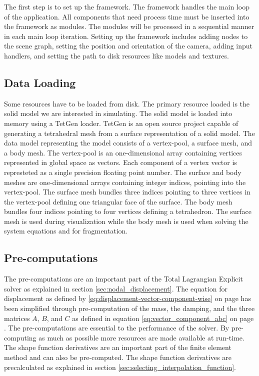 The first step is to set up the \openengine{} framework. The framework
handles the main loop of the application. All components that need
process time must be inserted into the framework as modules. The modules will be
processed in a sequential manner in each main loop iteration. Setting
up the framework includes adding 
nodes to the scene graph, setting the position and orientation of the
camera, adding input handlers, and setting the path to
disk resources like models and textures.


\subsection*{Data Loading}
\label{sec:data-model}
Some resources have to be loaded from disk. The primary 
resource loaded is the solid model we are interested in
simulating. The solid model is loaded into memory using a TetGen
loader. TetGen is
an open source project capable of generating a tetrahedral mesh
from a surface representation of a solid model. 
%
The data model representing the model consists of a vertex-pool, a
surface mesh, and a body mesh. The vertex-pool is an one-dimensional
array containing vertices represented in global space as vectors.
Each component of a vertex vector is represteted as a single
precision floating point
number. The surface and body meshes are one-dimensional arrays
containing integer indices, pointing into the vertex-pool.
The surface mesh bundles three indices pointing to three vertices
in the vertex-pool defining one triangular face of the surface.
The body mesh bundles four indices pointing to four vertices
defining a tetrahedron.
%
The surface mesh is used during visualization while the body
mesh is used when solving the system equations and for
fragmentation.

\subsection*{Pre-computations}
\label{sec:precompuations}
The pre-computations are an important part of the Total Lagrangian Explicit
solver as explained in section \vref{sec:nodal_displacement}. The
equation for displacement as defined by \eqref{eq:displacement-vector-component-wise} on
page \pageref{eq:displacement-vector-component-wise} has been
simplified through pre-computation of the mass, the damping, and the
three matrices $A$, $B$, and $C$ as defined in equation
\eqref{eq:vector_component_abc} on page
\pageref{eq:vector_component_abc}. The pre-computations are essential
to the performance of the solver. By 
pre-computing as much as possible more resources are made available at run-time.
%
The shape function derivatives are an important part of the finite
element method and can also be
pre-computed. The shape function derivatives are precalculated as explained
in section \vref{sec:selecting_interpolation_function}.\\

